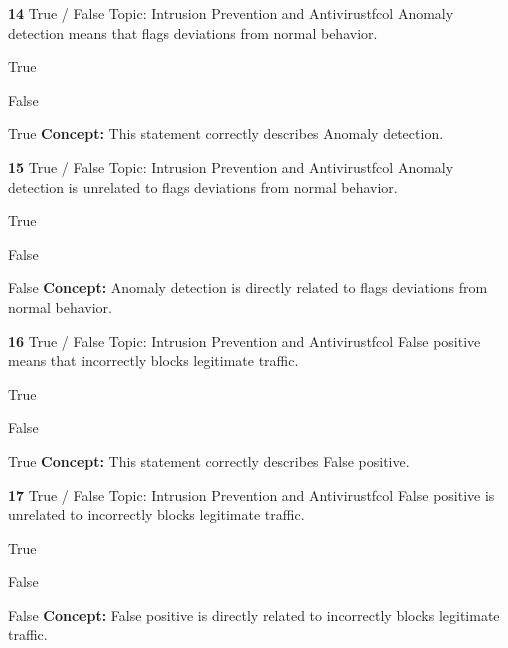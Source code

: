 \documentclass[10pt,a4paper]{article}
\begin{document}
\begin{qcard}{\color{white}\textbf{14} \hfill \small True / False \textbar{} Topic: Intrusion Prevention and Antivirus}{tfcol}
Anomaly detection means that flags deviations from normal behavior.

\begin{qoptions}
\item True
\item False
\end{qoptions}
\begin{explainbox}{True}
\textbf{Concept:} This statement correctly describes Anomaly detection.
\end{explainbox}
\end{qcard}

\begin{qcard}{\color{white}\textbf{15} \hfill \small True / False \textbar{} Topic: Intrusion Prevention and Antivirus}{tfcol}
Anomaly detection is unrelated to flags deviations from normal behavior.

\begin{qoptions}
\item True
\item False
\end{qoptions}
\begin{explainbox}{False}
\textbf{Concept:} Anomaly detection is directly related to flags deviations from normal behavior.
\end{explainbox}
\end{qcard}

\begin{qcard}{\color{white}\textbf{16} \hfill \small True / False \textbar{} Topic: Intrusion Prevention and Antivirus}{tfcol}
False positive means that incorrectly blocks legitimate traffic.

\begin{qoptions}
\item True
\item False
\end{qoptions}
\begin{explainbox}{True}
\textbf{Concept:} This statement correctly describes False positive.
\end{explainbox}
\end{qcard}

\begin{qcard}{\color{white}\textbf{17} \hfill \small True / False \textbar{} Topic: Intrusion Prevention and Antivirus}{tfcol}
False positive is unrelated to incorrectly blocks legitimate traffic.

\begin{qoptions}
\item True
\item False
\end{qoptions}
\begin{explainbox}{False}
\textbf{Concept:} False positive is directly related to incorrectly blocks legitimate traffic.
\end{explainbox}
\end{qcard}
\end{document}

